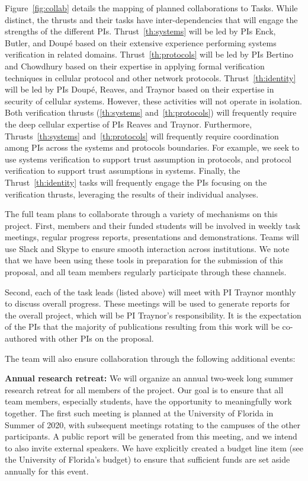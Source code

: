 Figure~\ref{fig:collab} details the mapping of planned collaborations to
Tasks.  While distinct, the thrusts and their tasks have
inter-dependencies that will engage the strengths of the different PIs.
Thrust~\ref{th:systems} will be led by PIs Enck, Butler, and Doup\'e
based on their extensive experience performing systems verification in
related domains.  Thrust~\ref{th:protocols} will be led by PIs Bertino
and Chowdhury based on their expertise in applying formal verification
techniques in cellular protocol and other network protocols.
Thrust~\ref{th:identity} will be led by PIs Doup\'e, Reaves, and Traynor
based on their expertise in security of cellular systems.  However,
these activities will not operate in isolation.  Both verification
thrusts (\ref{th:systems} and~\ref{th:protocols}) will frequently
require the deep cellular expertise of PIs Reaves and Traynor.
Furthermore, Thrusts~\ref{th:systems} and~\ref{th:protocols} will
frequently require coordination among PIs across the systems and
protocols boundaries.  For example, we seek to use systems verification
to support trust assumption in protocols, and protocol verification to
support trust assumptions in systems. Finally, the
Thrust~\ref{th:identity} tasks will frequently engage the PIs focusing
on the verification thrusts, leveraging the results of their individual
analyses.


The full team plans to collaborate through a variety of mechanisms on
this project. First, members and their funded students will be involved
in weekly task meetings, regular progress reports, presentations and
demonstrations. Teams will use Slack and Skype to ensure smooth
interaction across institutions. We note that we have been using these
tools in preparation for the submission of this proposal, and all team
members regularly participate through these channels. 

Second, each of the task leads (listed above) will meet with PI
Traynor monthly to discuss overall progress. These meetings will be used
to generate reports for the overall project, which will be PI Traynor's
responsibility. It is the expectation of the PIs that the majority of
publications resulting from this work will be co-authored with other PIs on
the proposal.

The team will also ensure collaboration through the following additional
events:

\vspace{0.2cm} 
\noindent \textbf{Annual research retreat:} We will organize an annual
two-week long summer research retreat for all members of the project.
Our goal is to ensure that all team members, especially students, have
the opportunity to meaningfully work together. The first such meeting is planned
at the University of Florida in Summer of 2020, with subsequent
meetings rotating to the campuses of the other participants. A public
report will be generated from this meeting, and we intend to also invite
external speakers. We have explicitly created a budget line item (see
the University of Florida's budget) to ensure that sufficient funds are
set aside annually for this event. 

